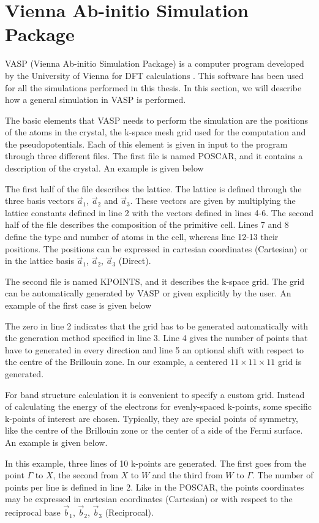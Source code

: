 \section{Vienna Ab-initio Simulation Package}
VASP (Vienna Ab-initio Simulation Package) is a computer program  developed by the University of Vienna for DFT calculations \cite{kresse1993,kresse1996,kresse1996a,kresse1999}. This software has been used for all the simulations performed in this thesis. In this section, we will describe how a general simulation in VASP is performed.

The basic elements that VASP needs to perform the simulation are the positions of the atoms in the crystal, the k-space mesh grid used for the computation and the pseudopotentials. Each of this element is given in input to the program through three different files. The first file is named POSCAR, and it contains a description of the crystal. An example is given below

The first half of the file describes the lattice. The lattice is defined through the three basis vectors $\vec{a}_1$, $\vec{a}_2$ and $\vec{a}_3$. These vectors are given by multiplying the lattice constants defined in line 2 with the vectors defined in lines 4-6. The second half of the file describes the composition of the primitive cell. Lines 7 and 8 define the type and number of atoms in the cell, whereas line 12-13 their positions. The positions can be expressed in cartesian coordinates (Cartesian) or in the lattice basis $\vec{a}_1$, $\vec{a}_2$, $\vec{a}_3$ (Direct).

The second file is named KPOINTS, and it describes the k-space grid. The grid can be automatically generated by VASP or given explicitly by the user. An example of the first case is given below

The zero in line 2 indicates that the grid has to be generated automatically with the generation method specified in line 3. Line 4 gives the number of points that have to generated in every direction and line 5 an optional shift with respect to the centre of the Brillouin zone. In our example, a centered $11\times11\times11$ grid is generated.

For band structure calculation it is convenient to specify a custom grid. Instead of calculating the energy of the electrons for evenly-spaced k-points, some specific k-points of interest are chosen. Typically, they are special points of symmetry, like the centre of the Brillouin zone or the center of a side of the Fermi surface. An example is given below.

In this example, three lines of 10 k-points are generated. The first goes from the point $\Gamma$ to $X$, the second from $X$ to $W$ and the third from $W$ to $\Gamma$. The number of points per line is defined in line 2. Like in the POSCAR, the points coordinates may be expressed in cartesian coordinates (Cartesian) or with respect to the reciprocal base $\vec{b}_1$, $\vec{b}_2$, $\vec{b}_3$ (Reciprocal).

